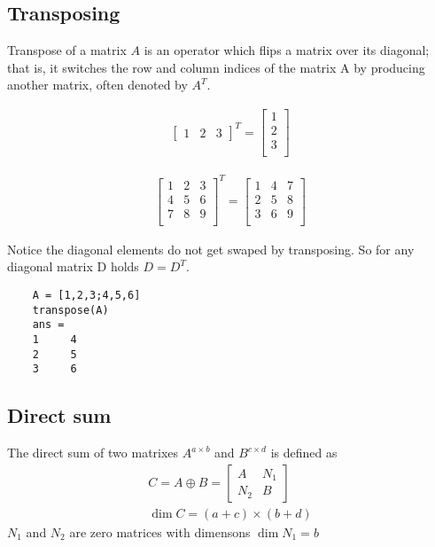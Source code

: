 \subsection{Transposing}
Transpose of a matrix \( A \) is an operator which flips a matrix over its diagonal; that is, it switches the row and column indices of the matrix A by producing another matrix, often denoted by $A^T$.
\begin{example}
    \begin{align*}
        \begin{bmatrix}
            1 & 2 & 3
        \end{bmatrix}^T = \begin{bmatrix}
            1 \\
            2 \\
            3 \\
        \end{bmatrix}
    \end{align*}
\end{example}
\begin{example}
    \begin{align*}
        \begin{bmatrix}
            1 & 2 & 3 \\
            4 & 5 & 6 \\
            7 & 8 & 9 \\
        \end{bmatrix}^T = \begin{bmatrix}
            1 & 4 & 7 \\
            2 & 5 & 8 \\
            3 & 6 & 9 \\
        \end{bmatrix}
    \end{align*}
\end{example}
Notice the diagonal elements do not get swaped by transposing. So for any diagonal matrix D holds $D=D^T$.
\begin{matlab}
    \begin{lstlisting}
    A = [1,2,3;4,5,6]
    transpose(A)
    ans =
    1     4
    2     5
    3     6
    \end{lstlisting}
\end{matlab}
\subsection{Direct sum}
The direct sum of two matrixes \(A^{a \times b}\) and \(B^{c \times d}\) is defined as
\begin{equation}
    \begin{split}
        C = A \oplus B = \begin{bmatrix}
            A & N_1 \\ N_2 & B
        \end{bmatrix} \\
        \dim C = (a + c) \times (b + d)
    \end{split}
\end{equation}
\(N_1\) and \(N_2\) are zero matrices with dimensons \(\dim N_1 = b\)
